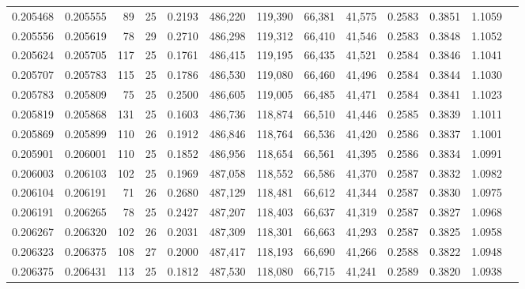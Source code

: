 \begin{tabular}{rrrrrrrrrrrrr}
0.205468 & 0.205555 &  89 &  25 &                                     0.2193 & 486,220 & 119,390 &  66,381 &  41,575 & 0.2583 & 0.3851 & 1.1059 \\
0.205556 & 0.205619 &  78 &  29 &                                     0.2710 & 486,298 & 119,312 &  66,410 &  41,546 & 0.2583 & 0.3848 & 1.1052 \\
0.205624 & 0.205705 & 117 &  25 &                                     0.1761 & 486,415 & 119,195 &  66,435 &  41,521 & 0.2584 & 0.3846 & 1.1041 \\
0.205707 & 0.205783 & 115 &  25 &                                     0.1786 & 486,530 & 119,080 &  66,460 &  41,496 & 0.2584 & 0.3844 & 1.1030 \\
0.205783 & 0.205809 &  75 &  25 &                                     0.2500 & 486,605 & 119,005 &  66,485 &  41,471 & 0.2584 & 0.3841 & 1.1023 \\
0.205819 & 0.205868 & 131 &  25 &                                     0.1603 & 486,736 & 118,874 &  66,510 &  41,446 & 0.2585 & 0.3839 & 1.1011 \\
0.205869 & 0.205899 & 110 &  26 &                                     0.1912 & 486,846 & 118,764 &  66,536 &  41,420 & 0.2586 & 0.3837 & 1.1001 \\
0.205901 & 0.206001 & 110 &  25 &                                     0.1852 & 486,956 & 118,654 &  66,561 &  41,395 & 0.2586 & 0.3834 & 1.0991 \\
0.206003 & 0.206103 & 102 &  25 &                                     0.1969 & 487,058 & 118,552 &  66,586 &  41,370 & 0.2587 & 0.3832 & 1.0982 \\
0.206104 & 0.206191 &  71 &  26 &                                     0.2680 & 487,129 & 118,481 &  66,612 &  41,344 & 0.2587 & 0.3830 & 1.0975 \\
0.206191 & 0.206265 &  78 &  25 &                                     0.2427 & 487,207 & 118,403 &  66,637 &  41,319 & 0.2587 & 0.3827 & 1.0968 \\
0.206267 & 0.206320 & 102 &  26 &                                     0.2031 & 487,309 & 118,301 &  66,663 &  41,293 & 0.2587 & 0.3825 & 1.0958 \\
0.206323 & 0.206375 & 108 &  27 &                                     0.2000 & 487,417 & 118,193 &  66,690 &  41,266 & 0.2588 & 0.3822 & 1.0948 \\
0.206375 & 0.206431 & 113 &  25 &                                     0.1812 & 487,530 & 118,080 &  66,715 &  41,241 & 0.2589 & 0.3820 & 1.0938 \\

\end{tabular}
